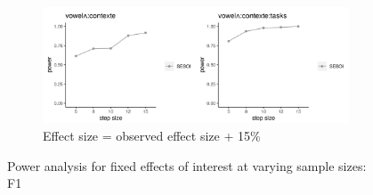\documentclass[12 pt]{article}
\begin{document}
\begin{figure}
	\begin{subfigure}[t]{0.8\textwidth}
		\centering
		\includegraphics[width=\textwidth]{powerplot_f1_plus15} 
		\caption{Effect size = observed effect size + 15\%} \label{f1_plus15}
	\end{subfigure}
	
	\caption{Power analysis for fixed effects of interest at varying sample sizes: F1}
	
\end{figure}

\newpage
\end{document}

